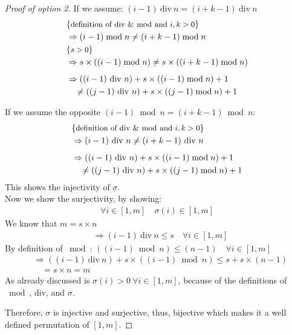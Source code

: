 \begin{proof}[Proof of option 2]
  If we assume: $(i-1)\ \text{div}\ n = (i+k-1)\ \text{div}\ n$
  \begin{align*}
    &\{\text{\small definition of \text{div} \& $\bmod{}$ and $i,k > 0$}\}\\
    &\Rightarrow (i-1)\bmod{n} \neq (i+k-1)\bmod{n}\\
    &\{\text{\small $s>0$}\}\\
    &\Rightarrow s \times ((i-1)\bmod{n}) \neq s \times ((i+k-1)\bmod{n})\\[.5em]
    &\Rightarrow ((i-1)\ \text{div}\ n) + s\times ((i-1)\bmod{n}) + 1\\
    &\quad \neq ((j-1)\ \text{div}\ n) + s\times ((j-1)\bmod{n}) + 1
  \end{align*}

  If we assume the opposite $(i-1)\bmod{n} = (i+k-1)\bmod{n}$:
  \begin{align*}
    &\comment{definition of \text{div} \& $\bmod{}$ and $i,k > 0$}\\
    &\Rightarrow (i-1)\ \text{div}\ n \neq (i+k-1)\ \text{div}\ n\\[.5em]
    &\Rightarrow ((i-1)\ \text{div}\ n) + s\times ((i-1)\bmod{n}) + 1\\
    &\quad \neq ((j-1)\ \text{div}\ n) + s\times ((j-1)\bmod{n}) + 1
  \end{align*}
  This shows the injectivity of $\sigma$.\\[.5em]

  \noindent
  Now we show the surjectivity, by showing:
  \begin{align*}
    \forall i \in [1, m]\quad \sigma(i)\in [1, m]
  \end{align*}
  We know that $m= s\times n$
  \begin{align*}
    &\Rightarrow (i-1)\ \text{div}\ n \leq s \quad \forall i\in [1,m]
  \end{align*}
  By definition of $\bmod{}$: $((i-1)\bmod{n}) \leq (n-1)\quad \forall i\in [1,m]$
  \begin{align*}
    &\Rightarrow ((i-1)\ \text{div}\ n) + s\times ((i-1)\bmod{n}) \leq s + s\times (n-1)\\
    &\quad = s\times n = m
  \end{align*}
  As already discussed is $\sigma(i)>0\ \forall i\in [1,m]$, because of the definitions of $\bmod{}$, div, and $\sigma$.

  Therefore, $\sigma$ is injective and surjective, thus, bijective which makes it a well defined permutation of $[1,m]$.

\end{proof}


